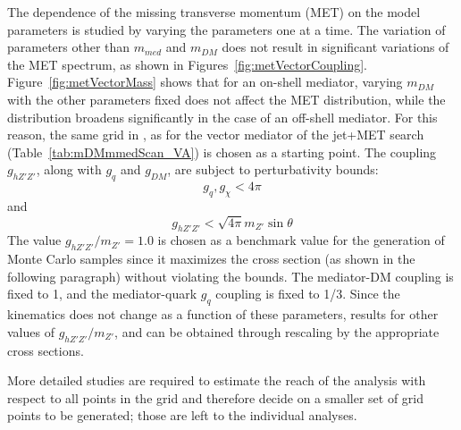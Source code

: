 The dependence of the missing transverse momentum (MET) on the model parameters 
is studied by varying the parameters one at a time. The variation of parameters 
other than $m_{med}$ and $m_{DM}$ does not result in significant 
variations of the MET spectrum, as shown in Figures~\ref{fig:metVectorCoupling}. 
Figure~\ref{fig:metVectorMass} shows that for an on-shell mediator, 
varying $m_{DM}$ with the other parameters fixed does not affect the MET distribution, while 
the distribution broadens significantly in the case of an off-shell mediator. 
For this reason, the same grid in \mmed, \mdm as for the vector mediator
of the jet+MET search (Table~\ref{tab:mDMmmedScan_VA}) is chosen as a starting point. 
The coupling $g_{hZ'Z'}$, along with $g_q$ and $g_{DM}$, are subject to perturbativity bounds:
$$g_q, g_\chi < 4\pi $$ and $$  g_{hZ'Z'} < \sqrt{4\pi}m_{Z'}\sin\theta$$ 
The value $g_{hZ'Z'}/m_{Z'} = 1.0$ is chosen as a benchmark value for the generation 
of Monte Carlo samples since it maximizes the cross section (as shown in the following paragraph)
without violating the bounds. The mediator-DM coupling \gdm is fixed to 1, and  
the mediator-quark $g_{q}$ coupling is fixed to 1/3. 
Since the kinematics does not change as a function of these parameters, 
results for other values of  $g_{hZ'Z'}/m_{Z'}$, \gdm and \gq can be 
obtained through rescaling by the appropriate cross sections. 

More detailed studies are required to estimate the reach of the analysis with respect to all points in the grid
and therefore decide on a smaller set of grid points to be generated; 
those are left to the individual analyses. 

